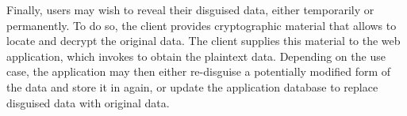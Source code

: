 %
Finally, users may wish to reveal their disguised data, either temporarily or
permanently.
%
To do so, the client provides cryptographic material that allows \sys to locate
and decrypt the original data.
%
The client supplies this material to the web application, which invokes \sys
to obtain the plaintext data.
%
Depending on the use case, the application may then either re-disguise a
potentially modified form of the data and store it in \sys again, or update the
application database to replace disguised data with original data.
%
